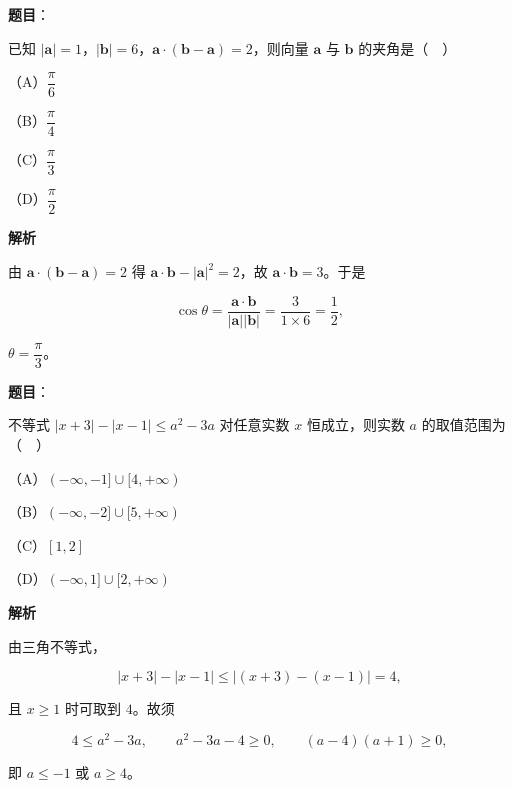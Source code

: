 \begin{answer}

\textbf{题目}：

已知 $|\boldsymbol a|=1$，$|\boldsymbol b|=6$，$\boldsymbol a\cdot(\boldsymbol b-\boldsymbol a)=2$，则向量 $\boldsymbol a$ 与 $\boldsymbol b$ 的夹角是（　）

（A）$\dfrac\pi6$

（B）$\dfrac\pi4$

（C）$\dfrac\pi3$

（D）$\dfrac\pi2$

\textbf{解析}

由 $\boldsymbol a\cdot(\boldsymbol b-\boldsymbol a)=2$ 得 $\boldsymbol a\cdot\boldsymbol b-|\boldsymbol a|^2=2$，故 $\boldsymbol a\cdot\boldsymbol b=3$。于是

\nopagebreak[4]
\[\cos\theta=\frac{\boldsymbol a\cdot\boldsymbol b}{|\boldsymbol a||\boldsymbol b|}
=\frac3{1\times6}=\frac12,\]

$\theta=\dfrac\pi3$。


\end{answer}
\begin{answer}

\textbf{题目}：

不等式 $|x+3|-|x-1|\leqslant a^2-3a$ 对任意实数 $x$ 恒成立，则实数 $a$ 的取值范围为（　）

（A）$(-\infty,-1]\cup[4,+\infty)$

（B）$(-\infty,-2]\cup[5,+\infty)$

（C）$[1,2]$

（D）$(-\infty,1]\cup[2,+\infty)$

\textbf{解析}

由三角不等式，

\nopagebreak[4]
\[|x+3|-|x-1|\leqslant|(x+3)-(x-1)|=4,\]

且 $x\geqslant1$ 时可取到 $4$。故须

\nopagebreak[4]
\[4\leqslant a^2-3a,\qquad a^2-3a-4\geqslant0,\qquad (a-4)(a+1)\geqslant0,\]

即 $a\leqslant-1$ 或 $a\geqslant4$。


\end{answer}
